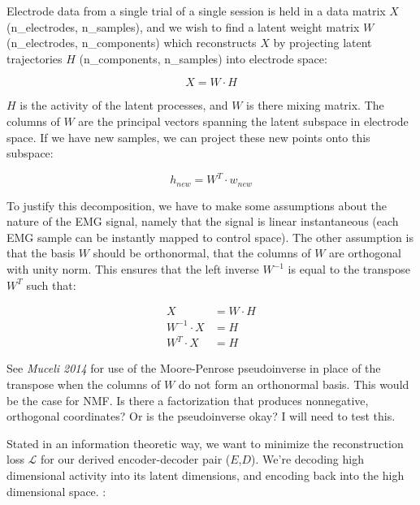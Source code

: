 {            Electrode data from a single trial of a single session is
            held in a data matrix \(X\) (n\_electrodes, n\_samples), and
            we wish to find a latent weight matrix \(W\) (n\_electrodes,
            n\_components) which reconstructs \(X\) by projecting latent
            trajectories \(H\) (n\_components, n\_samples) into
            electrode space:

            \[
            X = W\cdot{H}
            \]

            \(H\) is the activity of the latent processes, and \(W\) is
            there mixing matrix. The columns of \(W\) are the principal
            vectors spanning the latent subspace in electrode space. If
            we have new samples, we can project these new points onto
            this subspace:

            \[
            h_{new} = W^T\cdot{w_{new}}
            \]

            To justify this decomposition, we have to make some
            assumptions about the nature of the EMG signal, namely that
            the signal is linear instantaneous (each EMG sample can be
            instantly mapped to control space). The other assumption is
            that the basis \(W\) should be orthonormal, that the columns
            of \(W\) are orthogonal with unity norm. This ensures that
            the left inverse \(W^{-1}\) is equal to the transpose
            \(W^T\) such that:

            \[
            \begin{align}
            X &= W\cdot{H} \\
            W^{-1}\cdot{X} &= {H} \\
            W^{T}\cdot{X} &= {H}
            \end{align}
            \]

            See \emph{Muceli 2014} for use of the Moore-Penrose
            pseudoinverse in place of the transpose when the columns of
            \(W\) do not form an orthonormal basis. This would be the
            case for NMF. Is there a factorization that produces
            nonnegative, orthogonal coordinates? Or is the pseudoinverse
            okay? I will need to test this.

            Stated in an information theoretic way, we want to minimize
            the reconstruction loss \(\mathcal{L}\) for our derived
            encoder-decoder pair (\(E\),\(D\)). We're decoding high
            dimensional activity into its latent dimensions, and
            encoding back into the high dimensional space. :

}
